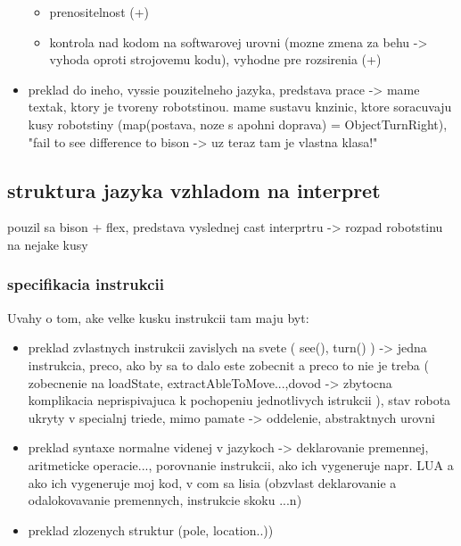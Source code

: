 \documentclass[12pt,notitlepage]{report}
\begin{document}
\begin{itemize}
\begin{itemize}
\item prenositelnost (+)
\item kontrola nad kodom na softwarovej urovni (mozne zmena za behu -> vyhoda oproti strojovemu kodu), vyhodne pre rozsirenia (+)
\end{itemize}
\item preklad do ineho, vyssie pouzitelneho jazyka, predstava prace -> mame textak, ktory je tvoreny robotstinou. mame sustavu knzinic, ktore soracuvaju kusy robotstiny (map(postava, noze s apohni doprava) = ObjectTurnRight), "fail to see difference to bison -> uz teraz tam je vlastna klasa!"
\end{itemize}
\subsection{struktura jazyka vzhladom na interpret}
pouzil sa bison + flex, predstava vyslednej cast interprtru -> rozpad robotstinu na nejake kusy
\subsubsection{specifikacia instrukcii}
Uvahy o tom, ake velke kusku instrukcii tam maju byt:
\begin{itemize}
\item preklad zvlastnych instrukcii zavislych na svete ( see(), turn() ) -> jedna instrukcia, preco, ako by sa to dalo este zobecnit a preco to nie je treba ( zobecnenie na loadState, extractAbleToMove...,dovod -> zbytocna komplikacia neprispivajuca k pochopeniu jednotlivych istrukcii ), stav robota ukryty v specialnj triede, mimo pamate -> oddelenie, abstraktnych urovni
\item preklad syntaxe normalne videnej v jazykoch -> deklarovanie premennej, aritmeticke operacie..., porovnanie instrukcii, ako ich vygeneruje napr. LUA a ako ich vygeneruje moj kod, v com sa lisia (obzvlast deklarovanie a odalokovavanie premennych, instrukcie skoku ...n)
\item preklad zlozenych struktur (pole, location..))
\end{itemize}
\end{document}
